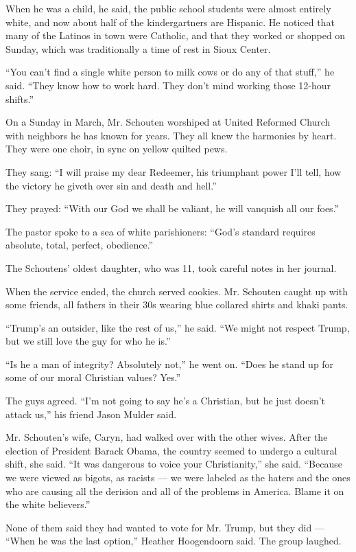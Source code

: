When he was a child, he said, the public school students were almost
entirely white, and now about half of the kindergartners are Hispanic.
He noticed that many of the Latinos in town were Catholic, and that they
worked or shopped on Sunday, which was traditionally a time of rest in
Sioux Center.

``You can't find a single white person to milk cows or do any of that
stuff,'' he said. ``They know how to work hard. They don't mind working
those 12-hour shifts.''

On a Sunday in March, Mr. Schouten worshiped at United Reformed Church
with neighbors he has known for years. They all knew the harmonies by
heart. They were one choir, in sync on yellow quilted pews.

They sang: ``I will praise my dear Redeemer, his triumphant power I'll
tell, how the victory he giveth over sin and death and hell.''

They prayed: ``With our God we shall be valiant, he will vanquish all
our foes.''

The pastor spoke to a sea of white parishioners: ``God's standard
requires absolute, total, perfect, obedience.''

The Schoutens' oldest daughter, who was 11, took careful notes in her
journal.

When the service ended, the church served cookies. Mr. Schouten caught
up with some friends, all fathers in their 30s wearing blue collared
shirts and khaki pants.

``Trump's an outsider, like the rest of us,'' he said. ``We might not
respect Trump, but we still love the guy for who he is.''

``Is he a man of integrity? Absolutely not,'' he went on. ``Does he
stand up for some of our moral Christian values? Yes.''

The guys agreed. ``I'm not going to say he's a Christian, but he just
doesn't attack us,'' his friend Jason Mulder said.

Mr. Schouten's wife, Caryn, had walked over with the other wives. After
the election of President Barack Obama, the country seemed to undergo a
cultural shift, she said. ``It was dangerous to voice your
Christianity,'' she said. ``Because we were viewed as bigots, as racists
--- we were labeled as the haters and the ones who are causing all the
derision and all of the problems in America. Blame it on the white
believers.''

None of them said they had wanted to vote for Mr. Trump, but they did
--- ``When he was the last option,'' Heather Hoogendoorn said. The group
laughed.

